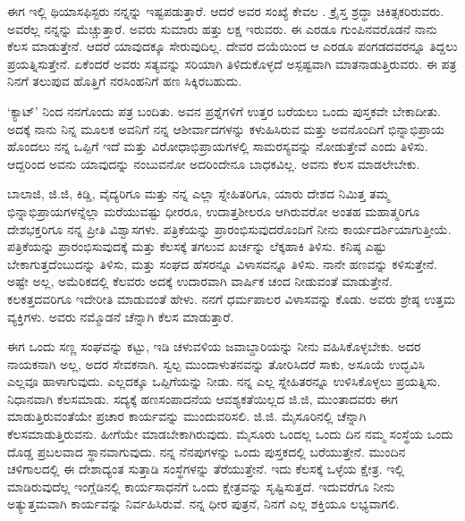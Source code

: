 \vspace{0.2cm}

ಈಗ ಇಲ್ಲಿ ಥಿಯಾಸಫಿಸ್ಟರು ನನ್ನನ್ನು ಇಷ್ಟಪಡುತ್ತಾರೆ. ಆದರೆ ಅವರ ಸಂಖ್ಯೆ ಕೇವಲ . ಕ್ರೈಸ್ತ ಶ್ರದ್ಧಾ ಚಿಕಿತ್ಸಕರಿರುವರು. ಅವರೆಲ್ಲ ನನ್ನನ್ನು ಮೆಚ್ಚುತ್ತಾರೆ. ಅವರು ಸುಮಾರು ಹತ್ತು ಲಕ್ಷ ಇರುವರು. ಈ ಎರಡೂ ಗುಂಪಿನವರೊಡನೆ ನಾನು ಕೆಲಸ ಮಾಡುತ್ತೇನೆ. ಆದರೆ ಯಾವುದಕ್ಕೂ ಸೇರುವುದಿಲ್ಲ. ದೇವರ ದಯೆಯಿಂದ ಆ ಎರಡೂ ಪಂಗಡದವರನ್ನೂ ತಿದ್ದಲು ಪ್ರಯತ್ನಿಸುತ್ತೇನೆ. ಏಕೆಂದರೆ ಅವರು ಸತ್ಯವನ್ನು ಸರಿಯಾಗಿ ತಿಳಿದುಕೊಳ್ಳದೆ ಅಸ್ಪಷ್ಟವಾಗಿ ಮಾತನಾಡುತ್ತಿರುವರು. ಈ ಪತ್ರ ನಿನಗೆ ತಲುಪುವ ಹೊತ್ತಿಗೆ ನರಸಿಂಹನಿಗೆ ಹಣ ಸಿಕ್ಕಿರಬಹುದು.

\vspace{0.2cm}

`ಕ್ಯಾಟ್' ನಿಂದ ನನಗೊಂದು ಪತ್ರ ಬಂದಿತು. ಅವನ ಪ್ರಶ್ನೆಗಳಿಗೆ ಉತ್ತರ ಬರೆಯಲು ಒಂದು ಪುಸ್ತಕವೇ ಬೇಕಾದೀತು. ಅದಕ್ಕೆ ನಾನು ನಿನ್ನ ಮೂಲಕ ಅವನಿಗೆ ನನ್ನ ಆಶೀರ್ವಾದಗಳನ್ನು ಕಳುಹಿಸಿರುವ ಮತ್ತು ಅವನೊಂದಿಗೆ ಭಿನ್ನಾಭಿಪ್ರಾಯ ಹೊಂದಲು ನನ್ನ ಒಪ್ಪಿಗೆ ಇದೆ ಮತ್ತು ವಿರೋಧಾಭಿಪ್ರಾಯಗಳಲ್ಲಿ ಸಾಮರಸ್ಯವನ್ನು ನೋಡುತ್ತೇವೆ ಎಂದು ತಿಳಿಸು. ಆದ್ದರಿಂದ ಅವನು ಯಾವುದನ್ನು ನಂಬುವನೋ ಅದರಿಂದೇನೂ ಬಾಧಕವಿಲ್ಲ. ಅವನು ಕೆಲಸ ಮಾಡಲೇಬೇಕು.

\vspace{0.2cm}

ಬಾಲಾಜಿ, ಜಿ.ಜಿ, ಕಿಡ್ಡಿ, ವೈದ್ಯರಿಗೂ ಮತ್ತು ನನ್ನ ಎಲ್ಲಾ ಸ್ನೇಹಿತರಿಗೂ, ಯಾರು ದೇಶದ ನಿಮಿತ್ತ ತಮ್ಮ ಭಿನ್ನಾಭಿಪ್ರಾಯಗಳನ್ನೆಲ್ಲಾ ಮರೆಯುವಷ್ಟು ಧೀರರೂ, ಉದಾತ್ತಶೀಲರೂ ಆಗಿರುವರೋ ಅಂತಹ ಮಹಾತ್ಮರಿಗೂ ದೇಶಭಕ್ತರಿಗೂ ನನ್ನ ಪ್ರೀತಿ ವಿಶ್ವಾಸಗಳು. ಪತ್ರಿಕೆಯನ್ನು ಪ್ರಾರಂಭಿಸುವುದರೊಂದಿಗೆ ನೀನು ಕಾರ್ಯದರ್ಶಿಯಾಗುತ್ತೀಯೆ. ಪತ್ರಿಕೆಯನ್ನು ಪ್ರಾರಂಭಿಸುವುದಕ್ಕೆ ಮತ್ತು ಕೆಲಸಕ್ಕೆ ತಗಲುವ ಖರ್ಚನ್ನು ಲೆಕ್ಕಹಾಕಿ ತಿಳಿಸು. ಕನಿಷ್ಠ ಎಷ್ಟು ಬೇಕಾಗುತ್ತದೆಂಬುದನ್ನು ತಿಳಿಸು, ಮತ್ತು ಸಂಘದ ಹೆಸರನ್ನೂ ವಿಳಾಸವನ್ನೂ ತಿಳಿಸು. ನಾನೇ ಹಣವನ್ನು ಕಳಿಸುತ್ತೇನೆ. ಅಷ್ಟೇ ಅಲ್ಲ, ಅಮೆರಿಕದಲ್ಲಿ ಕೆಲವರು ಅದಕ್ಕೆ ಉದಾರವಾಗಿ ವಾರ್ಷಿಕ ಚಂದ ನೀಡುವಂತೆ ಮಾಡುತ್ತೇನೆ. ಕಲಕತ್ತದವರಿಗೂ ಇದೇರೀತಿ ಮಾಡುವಂತೆ ಹೇಳು. ನನಗೆ ಧರ್ಮಪಾಲರ ವಿಳಾಸವನ್ನು ಕೊಡು. ಅವರು ಶ್ರೇಷ್ಠ ಉತ್ತಮ ವ್ಯಕ್ತಿಗಳು. ಅವರು ನಮ್ಮೊಡನೆ ಚೆನ್ನಾಗಿ ಕೆಲಸ ಮಾಡುತ್ತಾರೆ.

\vspace{0.2cm}

ಈಗ ಒಂದು ಸಣ್ಣ ಸಂಘವನ್ನು ಕಟ್ಟು, ಇಡಿ ಚಳುವಳಿಯ ಜವಾಬ್ದಾರಿಯನ್ನು ನೀನು ವಹಿಸಿಕೊಳ್ಳಬೇಕು. ಅದರ ನಾಯಕನಾಗಿ ಅಲ್ಲ, ಅದರ ಸೇವಕನಾಗಿ. ಸ್ವಲ್ಪ ಮುಂದಾಳುತನವನ್ನು ತೋರಿಸಿದರೆ ಸಾಕು, ಅಸೂಯೆ ಉದ್ಭವಿಸಿ ಎಲ್ಲವೂ ಹಾಳಾಗುವುದು. ಎಲ್ಲದಕ್ಕೂ ಒಪ್ಪಿಗೆಯನ್ನು ನೀಡು. ನನ್ನ ಎಲ್ಲ ಸ್ನೇಹಿತರನ್ನೂ ಉಳಿಸಿಕೊಳ್ಳಲು ಪ್ರಯತ್ನಿಸು. ನಿಧಾನವಾಗಿ ಕೆಲಸಮಾಡು. ಸದ್ಯಕ್ಕೆ ಹಣಸಂಪಾದನೆಯ ಆವಶ್ಯಕತೆಯಿಲ್ಲದ ಜಿ.ಜಿ, ಮುಂತಾದವರು ಈಗ ಮಾಡುತ್ತಿರುವಂತೆಯೇ ಪ್ರಚಾರ ಕಾರ್ಯವನ್ನು ಮುಂದುವರಿಸಲಿ. ಜಿ.ಜಿ. ಮೈಸೂರಿನಲ್ಲಿ ಚೆನ್ನಾಗಿ ಕೆಲಸಮಾಡುತ್ತಿರುವನು. ಹೀಗೆಯೇ ಮಾಡಬೇಕಾಗಿರುವುದು. ಮೈಸೂರು ಒಂದಲ್ಲ ಒಂದು ದಿನ ನಮ್ಮ ಸಂಸ್ಥೆಯ ಒಂದು ದೊಡ್ಡ ಪ್ರಬಲವಾದ ಸ್ಥಾನವಾಗುವುದು. ನನ್ನ ನೆನಪುಗಳನ್ನು ಒಂದು ಪುಸ್ತಕದಲ್ಲಿ ಬರೆಯುತ್ತೇನೆ. ಮುಂದಿನ ಚಳಿಗಾಲದಲ್ಲಿ ಈ ದೇಶಾದ್ಯಂತ ಸುತ್ತಾಡಿ ಸಂಸ್ಥೆಗಳನ್ನು ತೆರೆಯುತ್ತೇನೆ. ಇದು ಕೆಲಸಕ್ಕೆ ಒಳ್ಳೆಯ ಕ್ಷೇತ್ರ. ಇಲ್ಲಿ ಮಾಡಿರುವುದೆಲ್ಲ ಇಂಗ್ಲೆಡಿನಲ್ಲಿ ಕಾರ್ಯಸಾಧನೆಗೆ ಒಂದು ಕ್ಷೇತ್ರವನ್ನು ಸೃಷ್ಟಿಸುತ್ತದೆ. ಇದುವರೆಗೂ ನೀನು ಅತ್ಯುತ್ತಮವಾಗಿ ಕಾರ್ಯವನ್ನು ನಿರ್ವಹಿಸಿರುವೆ. ನನ್ನ ಧೀರ ಪುತ್ರನೆ, ನಿನಗೆ ಎಲ್ಲ ಶಕ್ತಿಯೂ ಲಭ್ಯವಾಗಲಿ.


